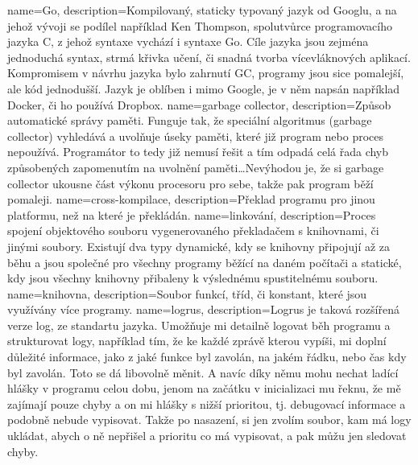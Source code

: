 {
  name={Go},
  description={Kompilovaný, staticky typovaný jazyk od Googlu, a na jehož vývoji se podílel například Ken Thompson, 
    spolutvůrce programovacího jazyka C, z jehož syntaxe vychází i syntaxe Go. Cíle jazyka jsou zejména jednoduchá 
    syntax, strmá křivka učení, či snadná tvorba vícevláknových aplikací. Kompromisem v návrhu jazyka bylo zahrnutí 
    \gls{GC}, programy jsou sice pomalejší, ale kód jednodušší. Jazyk je oblíben i mimo Google, je v něm napsán 
  například Docker, či ho používá Dropbox. \parencite{wiki:go}}
}
{
  name={garbage collector},
  description={Způsob automatické správy paměti. Funguje tak, že speciální algoritmus (garbage collector) vyhledává 
    a uvolňuje úseky paměti, které již program nebo proces nepoužívá. Programátor to tedy již nemusí řešit a tím odpadá 
    celá řada chyb způsobených zapomenutím na uvolnění paměti\ldots Nevýhodou je, že si garbage collector ukousne část 
  výkonu procesoru pro sebe, takže pak program běží pomaleji. \parencite{wiki:gc}}
}
{
  name={cross-kompilace},
  description={Překlad programu pro jinou platformu, než na které je překládán. \parencite{wiki:cross}}
}
{
  name={linkování},
  description={Proces spojení objektového souboru vygenerovaného překladačem s knihovnami, či jinými soubory. Existují 
  dva typy dynamické, kdy se knihovny připojují až za běhu a jsou společné pro všechny programy běžící na daném počítači 
a statické, kdy jsou všechny knihovny přibaleny k výslednému spustitelnému souboru. \parencite{wiki:link}}
}
{
  name={knihovna},
  description={Soubor funkcí, tříd, či konstant, které jsou využívány více programy. \parencite{wiki:knihovna}}
}
{
  name={logrus},
  description={Logrus je taková rozšířená verze  log, ze standartu jazyka. Umožňuje mi 
    detailně logovat běh programu a strukturovat logy, například tím, že ke každé zprávě kterou vypíši, mi doplní 
    důležité informace, jako z jaké funkce byl zavolán, na jakém řádku, nebo čas kdy byl zavolán. Toto se dá libovolně 
    měnit. A navíc díky němu mohu nechat ladící hlášky v programu celou dobu, jenom na začátku v inicializaci mu řeknu, 
  že mě zajímají pouze chyby a on mi hlášky s nižší prioritou, tj. debugovací informace a podobně nebude vypisovat. 
Takže po nasazení, si jen zvolím soubor, kam má logy ukládat, abych o ně nepřišel a prioritu co má vypisovat, a pak můžu 
jen sledovat chyby. \parencite{github:logrus}}
}
